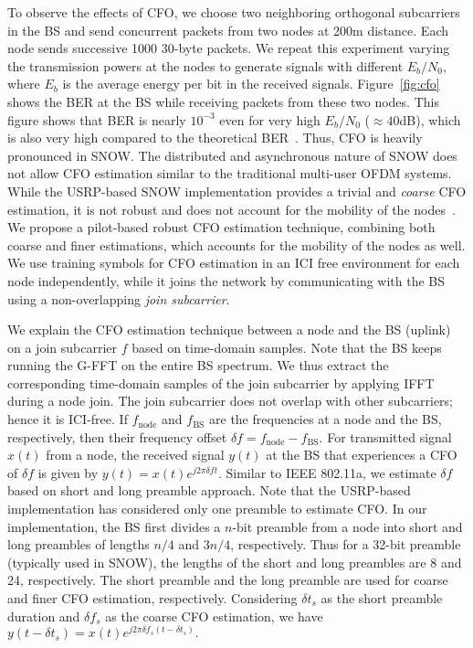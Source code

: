To observe the effects of CFO, we choose two neighboring orthogonal subcarriers in the BS and send concurrent packets from two nodes at 200m distance. Each node sends successive 1000 30-byte packets. We repeat this experiment varying the transmission powers at the nodes to generate signals with different $E_b/N_0$, where $E_b$ is the average energy per bit in the received signals. 
Figure~\ref{fig:cfo} shows the BER at the BS while receiving packets from these two nodes. This figure shows that BER is nearly $10^{-3}$ even for very high $E_b/N_0$ ($\approx 40$dB), which is also very high compared to the theoretical BER~\cite{choi2000carrier}. Thus, CFO is heavily pronounced in SNOW.
The distributed and asynchronous nature of SNOW does not allow CFO estimation similar to the traditional multi-user OFDM systems.
While the USRP-based SNOW implementation provides a trivial and {\em coarse} CFO estimation, it is not robust and does not account for the mobility of the nodes~\cite{snow_ton}.
We propose a pilot-based robust CFO estimation technique, combining both coarse and finer estimations, which accounts for the mobility of the nodes as well. We use training symbols for CFO estimation in an ICI free environment for each node independently, while it joins the network by communicating with the BS using a non-overlapping {\em join subcarrier}.


We explain the CFO estimation technique between a node and the BS (uplink) on a join subcarrier $f$ based on time-domain samples. Note that the BS keeps running the G-FFT on the entire BS spectrum. We thus extract the corresponding time-domain samples of the join subcarrier by applying IFFT during a node join. The join subcarrier does not overlap with other subcarriers; hence it is ICI-free. If $f_{\text{node}}$ and $f_{\text{BS}}$ are the frequencies at a node and the BS, respectively, then their frequency offset $\delta f = f_{\text{node}}-  f_{\text{BS}}$.
For transmitted signal $x(t)$ from a node, the received signal  $y(t)$ at the BS that experiences a CFO of $\delta f$ is given by 
$y(t)  = x(t) e^{j2\pi \delta f t}$.
Similar to IEEE 802.11a, we estimate $\delta f$ based on short and long preamble approach. Note that the USRP-based implementation has considered only one preamble to estimate CFO.
In our implementation, the BS first divides a $n$-bit preamble from a node into short and long preambles of lengths $n/4$ and $3n/4$, respectively. Thus for a 32-bit preamble (typically used in SNOW), the lengths of the short and long preambles are  8 and 24, respectively. 
The short preamble and the long preamble are used for coarse and finer CFO estimation, respectively. 
Considering $\delta t_s$ as the short preamble duration and $\delta f_s$ as the coarse CFO estimation, we have
$y(t-\delta t_s)  = x(t) e^{j2\pi \delta f_s (t-\delta t_s)}.$

